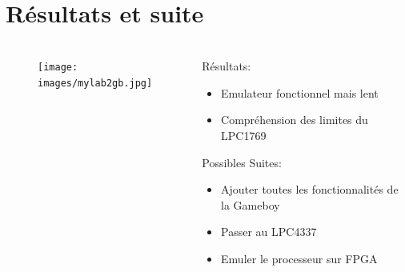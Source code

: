\documentclass{beamer}
\begin{document}
\section{Résultats et suite}
\begin{frame}
	\frametitle{\secname}
  \begin{columns}[T]
		\begin{column}{.40\textwidth}
			\begin{figure}
				\texttt{[image: images/mylab2gb.jpg]}
			\end{figure}
		\end{column}
		\begin{column}{.70\textwidth}
      Résultats:
      \begin{itemize}
        \item Emulateur fonctionnel mais lent
        \item Compréhension des limites du LPC1769
      \end{itemize}
      Possibles Suites:
      \begin{itemize}
        \item Ajouter toutes les fonctionnalités de la Gameboy
        \item Passer au LPC4337
        \item Emuler le processeur sur FPGA
      \end{itemize}
		\end{column}
	\end{columns}
\end{frame}
\end{document}
